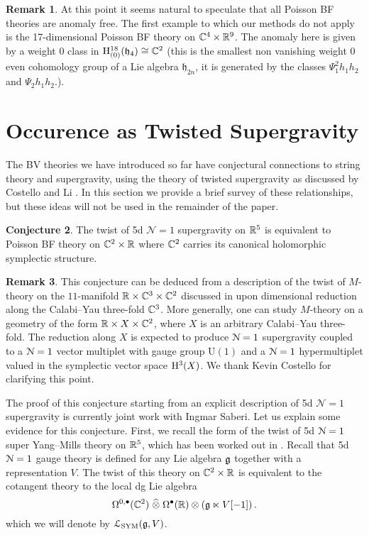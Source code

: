 \documentclass[11pt, oneside, reqno]{amsart}
\theoremstyle{definition} \newtheorem{definition}{Definition}[section]
\newtheorem{conjecture}[definition]{Conjecture}
\theoremstyle{definition}
\theoremstyle{remark}
\theoremstyle{definition} \newtheorem{remark}[definition]{Remark}
\theoremstyle{definition} \newtheorem{remarks}[definition]{Remarks}
\theoremstyle{definition} \newtheorem{question}[definition]{Question}
\theoremstyle{definition} \newtheorem*{note}{Note}
\theoremstyle{definition} \newtheorem{example}[definition]{Example}
\theoremstyle{definition} \newtheorem{examples}[definition]{Examples}
\def\bu{\bullet}
\def\Hat{\widehat}
\newcommand{\U}{\mathrm{U}}
\newcommand{\iso}{\cong}
\newcommand{\mr}[1]{\mathrm{#1}}
\newcommand{\mc}[1]{\mathcal{#1}}
\newcommand{\mf}[1]{\mathfrak{#1}}
\renewcommand{\U}{\mathrm{U}}
\begin{document}
\begin{remark} \label{general_quantization_remark}
At this point it seems natural to speculate that all Poisson BF theories are anomaly free.  The first example to which our methods do not apply is the 17-dimensional Poisson BF theory on $\mathbb C^4 \times \mathbb R^9$.  The anomaly here is given by a weight 0 class in $\mr H_{(0)}^{18}(\mf h_4) \iso \CC^2$ (this is the smallest non vanishing weight 0 even cohomology group of a Lie algebra $\mf h_{2n}$, it is generated by the classes $\Psi_1^2h_1h_2$ and $\Psi_2h_1h_2$.).
\end{remark}

\section{Occurence as Twisted Supergravity} \label{sugra_section}

The BV theories we have introduced so far have conjectural connections to string theory and supergravity, using the theory of twisted supergravity as discussed by Costello and Li \cite{CostelloLiSUGRA}.  In this section we provide a brief survey of these relationships, but these ideas will not be used in the remainder of the paper.

\begin{conjecture}
The twist of 5d $\mc N = 1$ supergravity on $\mathbb R^5$ is equivalent to Poisson BF theory on $\mathbb C^2 \times \mathbb R$ where $\mathbb C^2$ carries its canonical holomorphic symplectic structure. 
\end{conjecture}

\begin{remark}
This conjecture can be deduced from a description of the twist of $M$-theory on the $11$-manifold $\mathbb R \times \mathbb C^3 \times \mathbb C^2$ discussed in \cite{PhilSurya} upon dimensional reduction along the Calabi--Yau three-fold $\mathbb C^3$. 
More generally, one can study $M$-theory on a geometry of the form $\mathbb R \times X \times \mathbb C^2$, where $X$ is an arbitrary Calabi--Yau three-fold.
The reduction along $X$ is expected to produce $\mathcal N=1$ supergravity coupled to a $\mathcal N=1$ vector multiplet with gauge group $\U(1)$ and a $\mathcal N = 1$ hypermultiplet valued in the symplectic vector space ${\rm H}^3(X)$. 
We thank Kevin Costello for clarifying this point.
\end{remark}

The proof of this conjecture starting from an explicit description of 5d $\mc N=1$ supergravity is currently joint work with Ingmar Saberi. Let us explain some evidence for this conjecture.  First, we recall the form of the twist of 5d $\mathcal N=1$ super Yang--Mills theory on $\mathbb R^5$, which has been worked out in \cite{ESW}. Recall that 5d $\mathcal N=1$ gauge theory is defined for any Lie algebra $\mathfrak g$ together with a representation $V$.
The twist of this theory on $\mathbb C^2 \times \mathbb R$ is equivalent to the cotangent theory to the local dg Lie algebra
\[
\Omega^{0,\bu}(\CC^2) \; \Hat{\otimes} \; \Omega^\bu(\RR) \otimes \left(\fg \ltimes V[-1] \right) .
\]
which we will denote by $\mathcal L_{\rm SYM}(\mathfrak g, V)$. 
\end{document}
